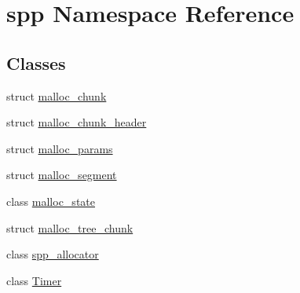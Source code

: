 \hypertarget{namespacespp}{}\section{spp Namespace Reference}
\label{namespacespp}
\subsection*{Classes}
\begin{DoxyCompactItemize}
\item 
struct \hyperlink{structspp_1_1malloc__chunk}{malloc\+\_\+chunk}
\item 
struct \hyperlink{structspp_1_1malloc__chunk__header}{malloc\+\_\+chunk\+\_\+header}
\item 
struct \hyperlink{structspp_1_1malloc__params}{malloc\+\_\+params}
\item 
struct \hyperlink{structspp_1_1malloc__segment}{malloc\+\_\+segment}
\item 
class \hyperlink{classspp_1_1malloc__state}{malloc\+\_\+state}
\item 
struct \hyperlink{structspp_1_1malloc__tree__chunk}{malloc\+\_\+tree\+\_\+chunk}
\item 
class \hyperlink{classspp_1_1spp__allocator}{spp\+\_\+allocator}
\item 
class \hyperlink{classspp_1_1_timer}{Timer}
\end{DoxyCompactItemize}
